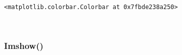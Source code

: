 \documentclass[11pt]{article}
\makeatletter
\newcommand{\boxspacing}{\kern\kvtcb@left@rule\kern\kvtcb@boxsep}
\newcommand{\prompt}[4]{
        {\ttfamily\llap{{\color{#2}[#3]:\hspace{3pt}#4}}\vspace{-\baselineskip}}
    }
\makeatother
\begin{document}
            \begin{tcolorbox}[breakable, size=fbox, boxrule=.5pt, pad at break*=1mm, opacityfill=0]
\prompt{Out}{outcolor}{32}{\boxspacing}
\begin{Verbatim}[commandchars=\\\{\}]
<matplotlib.colorbar.Colorbar at 0x7fbde238a250>
\end{Verbatim}
\end{tcolorbox}
        
    \begin{center}
    \end{center}
    { \hspace*{\fill} \\}
    
    \hypertarget{imshow}{%
\subsubsection{Imshow()}\label{imshow}}
\end{document}
